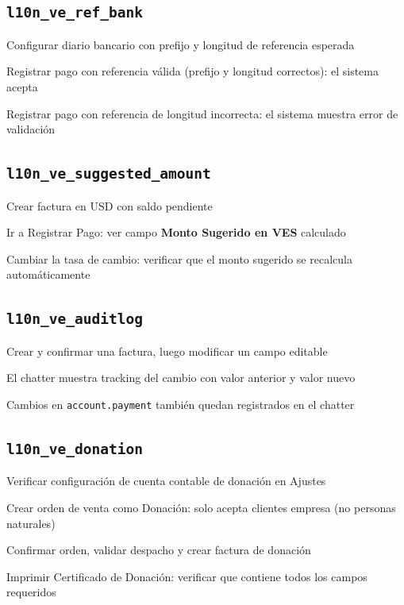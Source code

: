 \documentclass[11pt,a4paper]{article}
\newcommand{\modulo}[1]{\texttt{\textcolor{naranja}{#1}}}
\begin{document}
\begin{Form}
\subsection{\modulo{l10n\_ve\_ref\_bank}}

\begin{checklist}
  \item Configurar diario bancario con prefijo y longitud de referencia esperada
  \item Registrar pago con referencia válida (prefijo y longitud correctos): el sistema acepta
  \item Registrar pago con referencia de longitud incorrecta: el sistema muestra error de validación
\end{checklist}

\subsection{\modulo{l10n\_ve\_suggested\_amount}}

\begin{checklist}
  \item Crear factura en USD con saldo pendiente
  \item Ir a Registrar Pago: ver campo \textbf{Monto Sugerido en VES} calculado
  \item Cambiar la tasa de cambio: verificar que el monto sugerido se recalcula automáticamente
\end{checklist}

\subsection{\modulo{l10n\_ve\_auditlog}}

\begin{checklist}
  \item Crear y confirmar una factura, luego modificar un campo editable
  \item El chatter muestra tracking del cambio con valor anterior y valor nuevo
  \item Cambios en \texttt{account.payment} también quedan registrados en el chatter
\end{checklist}

\subsection{\modulo{l10n\_ve\_donation}}

\begin{checklist}
  \item Verificar configuración de cuenta contable de donación en Ajustes
  \item Crear orden de venta como Donación: solo acepta clientes empresa (no personas naturales)
  \item Confirmar orden, validar despacho y crear factura de donación
  \item Imprimir Certificado de Donación: verificar que contiene todos los campos requeridos
\end{checklist}


\end{Form}
\end{document}
